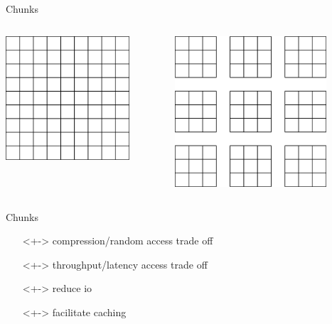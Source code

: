 \documentclass{beamer}
\begin{document}
\begin{frame}{Chunks}
  \begin{columns}[c]
    \begin{center}
      \includegraphics[width=0.8\textwidth]{images/contig-data.png}
    \end{center}

    \includegraphics[width=0.8\textwidth]{images/block-chunks.png}
  \end{columns}
\end{frame}

\begin{frame}{Chunks}
  \begin{itemize}
  \item[]<+-> compression/random access trade off
  \item[]<+-> throughput/latency access trade off
  \item[]<+-> reduce io
  \item[]<+-> facilitate caching
  \end{itemize}
\end{frame}
\end{document}
